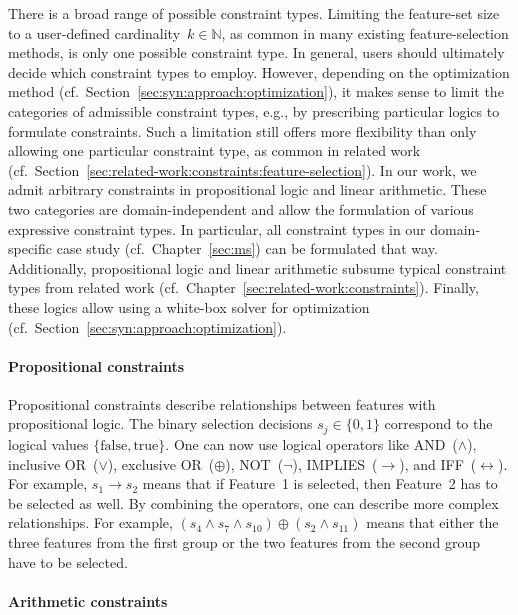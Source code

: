 There is a broad range of possible constraint types.
Limiting the feature-set size to a user-defined cardinality~$k \in \mathbb{N}$, as common in many existing feature-selection methods, is only one possible constraint type.
In general, users should ultimately decide which constraint types to employ.
However, depending on the optimization method (cf.~Section~\ref{sec:syn:approach:optimization}), it makes sense to limit the categories of admissible constraint types, e.g., by prescribing particular logics to formulate constraints.
Such a limitation still offers more flexibility than only allowing one particular constraint type, as common in related work (cf.~Section~\ref{sec:related-work:constraints:feature-selection}).
In our work, we admit arbitrary constraints in propositional logic and linear arithmetic.
These two categories are domain-independent and allow the formulation of various expressive constraint types.
In particular, all constraint types in our domain-specific case study (cf.~Chapter~\ref{sec:ms}) can be formulated that way.
Additionally, propositional logic and linear arithmetic subsume typical constraint types from related work (cf.~Chapter~\ref{sec:related-work:constraints}).
Finally, these logics allow using a white-box solver for optimization (cf.~Section~\ref{sec:syn:approach:optimization}).

\paragraph{Propositional constraints}

Propositional constraints describe relationships between features with propositional logic.
The binary selection decisions $s_j \in \{0,1\}$ correspond to the logical values $\{\text{false}, \text{true}\}$.
One can now use logical operators like AND~($\land$), inclusive OR~($\lor$), exclusive OR~($\oplus$), NOT~($\lnot$), IMPLIES~($\rightarrow$), and IFF~($\leftrightarrow$).
For example, $s_1 \rightarrow s_2$ means that if Feature~1 is selected, then Feature~2 has to be selected as well.
By combining the operators, one can describe more complex relationships.
For example, $(s_4 \land s_7 \land s_{10}) \oplus (s_2 \land s_{11})$ means that either the three features from the first group or the two features from the second group have to be selected.

\paragraph{Arithmetic constraints}

